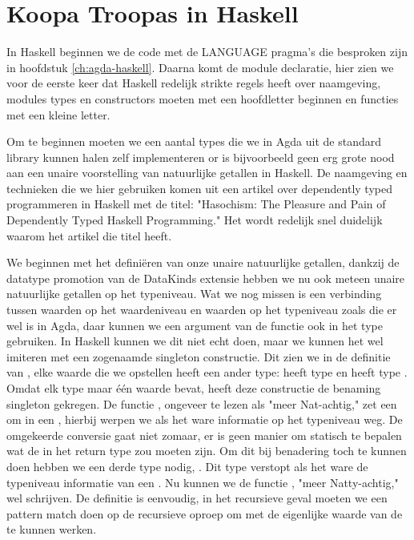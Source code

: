 \section{Koopa Troopas in Haskell}

In Haskell beginnen we de code met de LANGUAGE pragma's die besproken zijn in
hoofdstuk \ref{ch:agda-haskell}. Daarna komt de module declaratie, hier zien we
voor de eerste keer dat Haskell redelijk strikte regels heeft over naamgeving,
modules types en constructors moeten met een hoofdletter beginnen en functies
met een kleine letter.


Om te beginnen moeten we een aantal types die we in Agda uit de standard
library kunnen halen zelf implementeren or is bijvoorbeeld geen erg grote nood
aan een unaire voorstelling van natuurlijke getallen in Haskell. De naamgeving
en technieken die we hier gebruiken komen uit een artikel \cite{hasochism} over
dependently typed programmeren in Haskell met de titel: "Hasochism: The
Pleasure and Pain of Dependently Typed Haskell Programming." Het wordt redelijk
snel duidelijk waarom het artikel die titel heeft.


We beginnen met het definiëren van onze unaire natuurlijke getallen, dankzij de
datatype promotion van de DataKinds extensie hebben we nu ook meteen unaire
natuurlijke getallen op het typeniveau. Wat we nog missen is een verbinding
tussen waarden op het waardeniveau en waarden op het typeniveau zoals die er
wel is in Agda, daar kunnen we een argument van de functie ook in het type
gebruiken. In Haskell kunnen we dit niet echt doen, maar we kunnen het wel
imiteren met een zogenaamde singleton constructie. Dit zien we in de definitie
van , elke waarde die we opstellen heeft een ander type:
 heeft type  en  heeft type . Omdat elk type  maar één waarde bevat, heeft deze
constructie de benaming singleton gekregen. De functie , ongeveer
te lezen als "meer Nat-achtig," zet een  om in een ,
hierbij werpen we als het ware informatie op het typeniveau weg. De omgekeerde
conversie gaat niet zomaar, er is geen manier om statisch te bepalen wat de
 in het return type  zou moeten zijn. Om dit bij
benadering toch te kunnen doen hebben we een derde type nodig, .
Dit type verstopt als het ware de typeniveau informatie van een . Nu kunnen we de functie , "meer Natty-achtig," wel
schrijven. De definitie is eenvoudig, in het recursieve geval moeten we een
pattern match doen op de recursieve oproep om met de eigenlijke waarde van de
 te kunnen werken.

